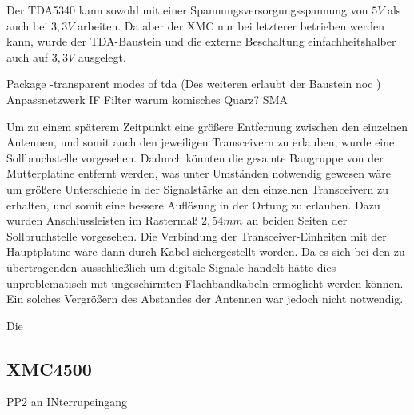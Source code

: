 Der TDA5340 kann sowohl mit einer Spannungsversorgungsspannung von $5V$ als auch bei $3,3V$ arbeiten. Da aber der XMC nur bei letzterer betrieben werden kann, wurde der TDA-Baustein und die externe Beschaltung einfachheitshalber auch auf  $3,3V$ ausgelegt. 

Package -transparent modes of tda (Des weiteren erlaubt der Baustein noc )
Anpassnetzwerk
IF Filter 
warum komisches Quarz?
SMA


Um zu einem späterem Zeitpunkt eine größere Entfernung zwischen den einzelnen Antennen, und somit auch den jeweiligen Transceivern zu erlauben, wurde eine Sollbruchstelle vorgesehen. Dadurch könnten die gesamte Baugruppe von der Mutterplatine entfernt werden, was unter Umständen notwendig gewesen wäre um größere Unterschiede in der Signalstärke an den einzelnen Transceivern zu erhalten, und somit eine bessere Auflösung in der Ortung zu erlauben. Dazu wurden Anschlussleisten im Rastermaß $2,54mm$ an beiden Seiten der Sollbruchstelle vorgesehen. Die Verbindung der Transceiver-Einheiten mit der Hauptplatine wäre dann durch Kabel sichergestellt worden. Da es sich bei den zu übertragenden ausschließlich um digitale Signale handelt hätte dies unproblematisch mit ungeschirmten Flachbandkabeln ermöglicht werden können. Ein solches Vergrößern des Abstandes der Antennen war jedoch nicht notwendig. 


Die 

\subsection{XMC4500}
PP2 an INterrupeingang
